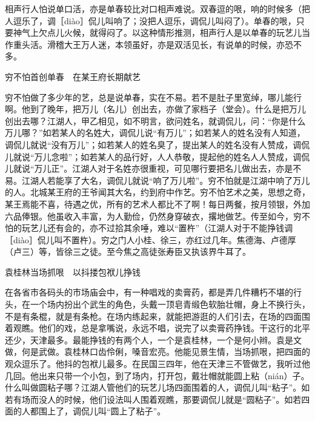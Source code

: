 \documentclass[12pt,UTF8]{ctexbook}
\begin{document}
相声行人怕说单口活，亦是单春较比对口相声难说。双春逗的哏，响的时候多（把人逗乐了，调［diào］侃儿叫响了；没把人逗乐，调侃儿叫闷了）。单春的哏，只要神气上欠点儿火候，就得闷了。以这种情形推测，相声行人是以单春的玩艺儿当作重头活。滑稽大王万人迷，本领虽好，亦是双活见长，有说单的时候，亦恐不多。





穷不怕首创单春　在某王府长期献艺


穷不怕做了多少年的艺，总是说单春，实在不易。若不是肚子里宽绰，哪儿能行啊。他到了晚年，把万儿（名儿）创出去，亦做了家档子（堂会）。什么是把万儿创出去哪？江湖人，甲乙相见，如不明言，欲问姓名，就调侃儿，问：“你是什么万儿哪？”如若某人的名姓大，调侃儿说“有万儿”；如若某人的姓名没有人知道，调侃儿就说“没有万儿”；如若某人的姓名臭了，提出某人的姓名没有人赞成，调侃儿就说“万儿念啦”；如若某人的品行好，人人恭敬，提起他的姓名人人赞成，调侃儿就说“万儿正”。江湖人对于名姓亦很重视，可见哪行要把名儿做出去，亦是不易。江湖人若能享了大名，调侃儿就说“响了万儿啦”。穷不怕就是江湖中响了万儿的人。北城某王府的王爷闻其大名，约到府中作艺。穷不怕艺术之美，思想之奇，某王焉能不喜，待遇之优，所有的艺术人都比不了啊！每日两餐，按月领银，外加六品俸银。他虽收入丰富，为人勤俭，仍然身穿破衣，撂地做艺。传至如今，穷不怕的玩艺儿还有会的，亦不过拾其余唾，难以“置杵”（江湖人对于不能挣钱调［diào］侃儿叫不置杵）。穷之门人小桂、徐三，亦红过几年。焦德海、卢德厚（卢三）等，皆徐三之徒。至今焦之高徒张寿臣又执该界牛耳了。





袁桂林当场抓哏　以抖搂包袱儿挣钱


在各省市各码头的市场庙会中，有一种唱戏的卖膏药，都是弄几件糟朽不堪的行头，在一个场内扮出个武生的角色，头戴一顶皂青缎色软胎壮帽，身上不换行头，不是有条棍，就是有条枪。在场内练起来，就能把游逛的人们引去，在场的四面围着观瞧。他们的戏，总是拿嘴说，永远不唱，说完了以卖膏药挣钱。干这行的北平还少，天津最多。最能挣钱的有两个人，一个是袁桂林，一个是何小辫。袁是文做，何是武做。袁桂林口齿伶俐，嗓音宏亮。他能见景生情，当场抓哏，把四面的观众逗乐了。他抖的包袱儿最多。在民国三四年，他在天津三不管做艺，我听过他几回。他出来只带一个小包，到了场内，打开包，戴壮帽就能圆上粘（nián）子。什么叫做圆粘子哪？江湖人管他们的玩艺儿场四面围着的人，调侃儿叫“粘子”。如若有场而没人的时候，他们设法叫人围着观瞧，那要调侃儿就是“圆粘子”。如若四面的人都围上了，调侃儿叫“圆上了粘子”。
\end{document}
